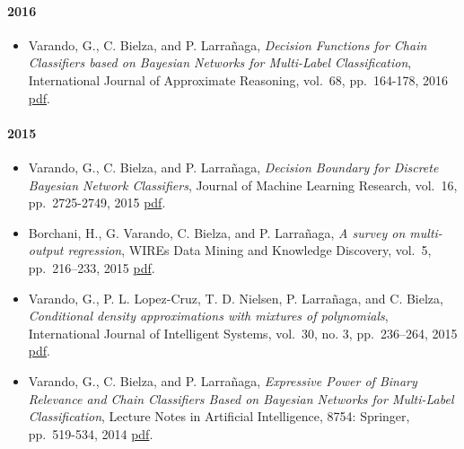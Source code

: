 \documentclass[]{article}
\providecommand{\tightlist}{%
  \setlength{\itemsep}{0pt}\setlength{\parskip}{0pt}}
\let\oldparagraph\paragraph
\renewcommand{\paragraph}[1]{\oldparagraph{#1}\mbox{}}
\begin{document}
\hypertarget{section-1}{%
\paragraph{2016}\label{section-1}}

\begin{itemize}
\tightlist
\item
  Varando, G., C. Bielza, and P. Larrañaga, \emph{Decision Functions for
  Chain Classifiers based on Bayesian Networks for Multi-Label
  Classification}, International Journal of Approximate Reasoning,
  vol.~68, pp.~164-178, 2016
  \href{https://www.sciencedirect.com/science/article/pii/S0888613X15000900}{pdf}.
\end{itemize}

\hypertarget{section-2}{%
\paragraph{2015}\label{section-2}}

\begin{itemize}
\tightlist
\item
  Varando, G., C. Bielza, and P. Larrañaga, \emph{Decision Boundary for
  Discrete Bayesian Network Classifiers}, Journal of Machine Learning
  Research, vol.~16, pp.~2725-2749, 2015
  \href{http://jmlr.csail.mit.edu/papers/volume16/varando15a/varando15a.pdf}{pdf}.
\item
  Borchani, H., G. Varando, C. Bielza, and P. Larrañaga, \emph{A survey
  on multi-output regression}, WIREs Data Mining and Knowledge
  Discovery, vol.~5, pp.~216--233, 2015
  \href{https://onlinelibrary.wiley.com/doi/full/10.1002/widm.1157}{pdf}.
\item
  Varando, G., P. L. Lopez-Cruz, T. D. Nielsen, P. Larrañaga, and C.
  Bielza, \emph{Conditional density approximations with mixtures of
  polynomials}, International Journal of Intelligent Systems, vol.~30,
  no. 3, pp.~236--264, 2015
  \href{https://onlinelibrary.wiley.com/doi/full/10.1002/int.21699}{pdf}.
\item
  Varando, G., C. Bielza, and P. Larrañaga, \emph{Expressive Power of
  Binary Relevance and Chain Classifiers Based on Bayesian Networks for
  Multi-Label Classification}, Lecture Notes in Artificial Intelligence,
  8754: Springer, pp.~519-534, 2014
  \href{https://link.springer.com/chapter/10.1007\%2F978-3-319-11433-0_34}{pdf}.
\end{itemize}
\end{document}

